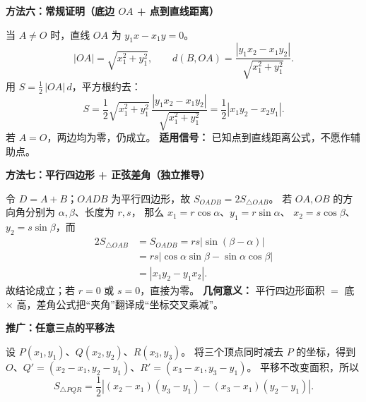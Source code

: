 \clearpage
\begin{proofbox}
\textbf{\textcolor{CProof}{方法六：常规证明（底边 $OA$ + 点到直线距离）}}

当 $A\ne O$ 时，直线 $OA$ 为 $y_1x-x_1y=0$。
\[
 |OA|=\sqrt{x_1^2+y_1^2},\qquad
 d(B,OA)=\frac{|y_1x_2-x_1y_2|}{\sqrt{x_1^2+y_1^2}}.
\]
用 $S=\tfrac12\,|OA|\,d$，平方根约去：
\[
 S=\frac12\sqrt{x_1^2+y_1^2}\,
 \frac{|y_1x_2-x_1y_2|}{\sqrt{x_1^2+y_1^2}}
 =\boxed{\frac12|x_1y_2-x_2y_1|}.
\]
若 $A=O$，两边均为零，仍成立。
\textbf{适用信号：} 已知点到直线距离公式，不愿作辅助点。

\medskip
\end{proofbox}
\clearpage
\begin{proofbox}
\textbf{\textcolor{CProof}{方法七：平行四边形 + 正弦差角（独立推导）}}

令 $D=A+B$；$OADB$ 为平行四边形，故 $S_{OADB}=2S_{\triangle OAB}$。
若 $OA,OB$ 的方向角分别为 $\alpha,\beta$、长度为 $r,s$，
那么 $x_1=r\cos\alpha$、$y_1=r\sin\alpha$、
$x_2=s\cos\beta$、$y_2=s\sin\beta$，而
\[
\begin{aligned}
 2S_{\triangle OAB}&=S_{OADB}=rs|\sin(\beta-\alpha)|\\
 &=rs|\cos\alpha\sin\beta-\sin\alpha\cos\beta|\\
 &=|x_1y_2-y_1x_2|.
\end{aligned}
\]
故结论成立；若 $r=0$ 或 $s=0$，直接为零。
\textbf{几何意义：} 平行四边形面积 $=$ 底 $\times$ 高，差角公式把“夹角”翻译成“坐标交叉乘减”。

\medskip
\end{proofbox}
\clearpage
\begin{proofbox}
\textbf{\textcolor{CProof}{推广：任意三点的平移法}}

设 $P(x_1,y_1)$、$Q(x_2,y_2)$、$R(x_3,y_3)$。
将三个顶点同时减去 $P$ 的坐标，得到
$O$、$Q'=(x_2-x_1,y_2-y_1)$、$R'=(x_3-x_1,y_3-y_1)$。
平移不改变面积，所以
\[
 \boxed{S_{\triangle PQR}=\frac12\left|
 (x_2-x_1)(y_3-y_1)-(x_3-x_1)(y_2-y_1)\right|.}
\]
\end{proofbox}
